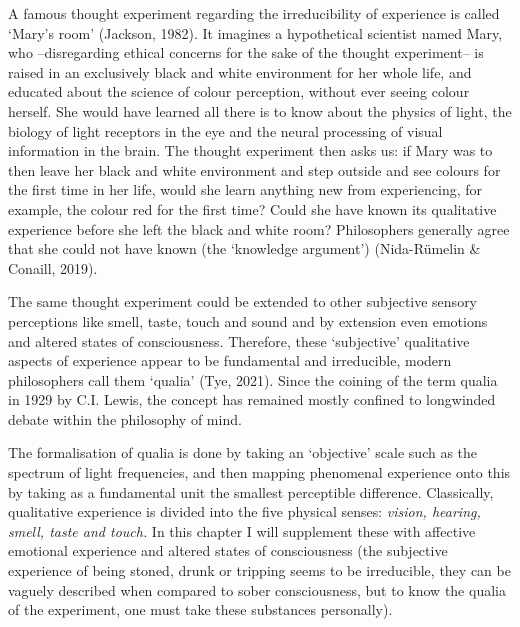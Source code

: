 A famous thought experiment regarding the irreducibility of experience is called ‘Mary’s room’ (Jackson, 1982). It imagines a hypothetical scientist named Mary, who --disregarding ethical concerns for the sake of the thought experiment-- is raised in an exclusively black and white environment for her whole life, and educated about the science of colour perception, without ever seeing colour herself. She would have learned all there is to know about the physics of light, the biology of light receptors in the eye and the neural processing of visual information in the brain. The thought experiment then asks us: if Mary was to then leave her black and white environment and step outside and see colours for the first time in her life, would she learn anything new from experiencing, for example, the colour red for the first time? Could she have known its qualitative experience before she left the black and white room? Philosophers generally agree that she could not have known (the ‘knowledge argument’) (Nida-Rümelin \& Conaill, 2019). 

The same thought experiment could be extended to other subjective sensory perceptions like smell, taste, touch and sound and by extension even emotions and altered states of consciousness. Therefore, these ‘subjective’ qualitative aspects of experience appear to be fundamental and irreducible, modern philosophers call them ‘qualia’ (Tye, 2021). Since the coining of the term qualia in 1929 by C.I. Lewis, the concept has remained mostly confined to longwinded debate within the philosophy of mind.  

The formalisation of qualia is done by taking an ‘objective’ scale such as the spectrum of light frequencies, and then mapping phenomenal experience onto this by taking as a fundamental unit the smallest perceptible difference. Classically, qualitative experience is divided into the five physical senses: \textit{vision, hearing, smell, taste and touch.} In this chapter I will supplement these with affective emotional experience and altered states of consciousness (the subjective experience of being stoned, drunk or tripping seems to be irreducible, they can be vaguely described when compared to sober consciousness, but to know the qualia of the experiment, one must take these substances personally). 

